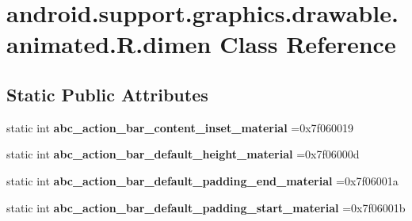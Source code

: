 \hypertarget{classandroid_1_1support_1_1graphics_1_1drawable_1_1animated_1_1R_1_1dimen}{}\section{android.\+support.\+graphics.\+drawable.\+animated.\+R.\+dimen Class Reference}
\label{classandroid_1_1support_1_1graphics_1_1drawable_1_1animated_1_1R_1_1dimen}
\subsection*{Static Public Attributes}
\begin{DoxyCompactItemize}
\item 
\mbox{\label{classandroid_1_1support_1_1graphics_1_1drawable_1_1animated_1_1R_1_1dimen_ad29da506e5dd91408c3e1add4a748e70}} 
static int {\bfseries abc\+\_\+action\+\_\+bar\+\_\+content\+\_\+inset\+\_\+material} =0x7f060019
\item 
\mbox{\label{classandroid_1_1support_1_1graphics_1_1drawable_1_1animated_1_1R_1_1dimen_aac19249c4d73a27fbf753274dac97316}} 
static int {\bfseries abc\+\_\+action\+\_\+bar\+\_\+default\+\_\+height\+\_\+material} =0x7f06000d
\item 
\mbox{\label{classandroid_1_1support_1_1graphics_1_1drawable_1_1animated_1_1R_1_1dimen_aa86a5ddd6cbdb146a403b3945038166b}} 
static int {\bfseries abc\+\_\+action\+\_\+bar\+\_\+default\+\_\+padding\+\_\+end\+\_\+material} =0x7f06001a
\item 
\mbox{\label{classandroid_1_1support_1_1graphics_1_1drawable_1_1animated_1_1R_1_1dimen_a14a1ead83a12b7becefc5232e25f9d2a}} 
static int {\bfseries abc\+\_\+action\+\_\+bar\+\_\+default\+\_\+padding\+\_\+start\+\_\+material} =0x7f06001b
\item 
\mbox{\label{classandroid_1_1support_1_1graphics_1_1drawable_1_1animated_1_1R_1_1dimen_a193f33d856450035c49f0029dcb1a1e6}} 

\end{DoxyCompactItemize}

